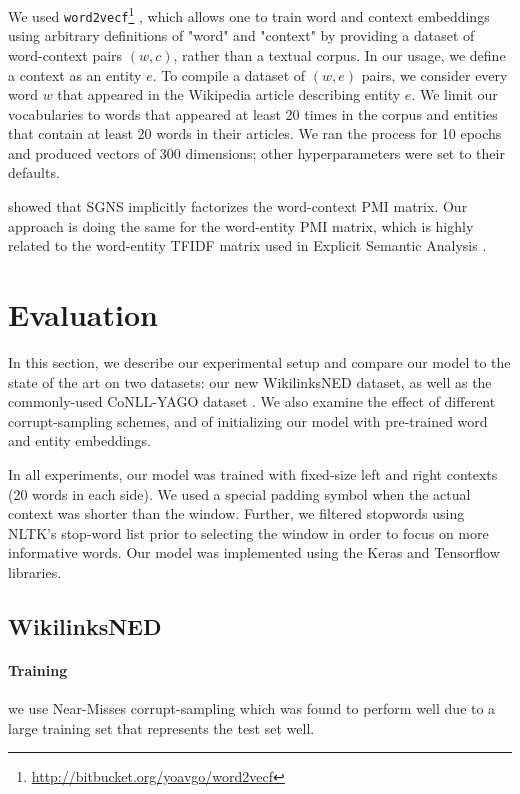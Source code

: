 \documentclass[11pt,a4paper]{article}
\begin{document}
	We used \texttt{word2vecf}\footnote{\url{http://bitbucket.org/yoavgo/word2vecf}} \cite{levy2014dependency}, which allows one to train word and context embeddings using arbitrary definitions of "word" and "context" by providing a dataset of word-context pairs $(w,c)$, rather than a textual corpus. In our usage, we define a context as an entity $e$. To compile a dataset of $(w,e)$ pairs, we consider every word $w$ that appeared in the Wikipedia article describing entity $e$. We limit our vocabularies to words that appeared at least 20 times in the corpus and entities that contain at least 20 words in their articles. We ran the process for 10 epochs and produced vectors of 300 dimensions; other hyperparameters were set to their defaults.
	
	 showed that SGNS implicitly factorizes the word-context PMI matrix. Our approach is doing the same for the word-entity PMI matrix, which is highly related to the word-entity TFIDF matrix used in Explicit Semantic Analysis \cite{gabrilovich2007computing}.
	
	\section{Evaluation}
	\label{experiments}
	
	In this section, we describe our experimental setup and compare our model to the state of the art on two datasets: our new WikilinksNED dataset, as well as the commonly-used CoNLL-YAGO dataset \cite{hoffart2011robust}. We also examine the effect of different corrupt-sampling schemes, and of initializing our model with pre-trained word and entity embeddings.
	
	In all experiments, our model was trained with fixed-size left and right contexts (20 words in each side). We used a special padding symbol when the actual context was shorter than the window. Further, we filtered stopwords using NLTK's stop-word list prior to selecting the window in order to focus on more informative words. Our model was implemented using the Keras \cite{chollet2015} and Tensorflow \cite{tensorflow2015-whitepaper} libraries.
	
	\subsection{WikilinksNED}
	
	\paragraph{Training} we use Near-Misses corrupt-sampling which was found to perform well due to a large training set that represents the test set well.
	
\end{document}
